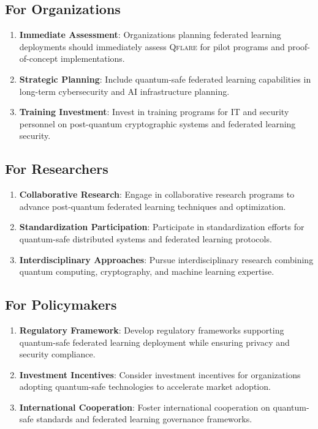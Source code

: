\documentclass[12pt,a4paper,twoside]{book}
\newcommand{\qflare}{\textsc{Qflare}}
\begin{document}
\subsection{For Organizations}

\begin{enumerate}
\item \textbf{Immediate Assessment}: Organizations planning federated learning deployments should immediately assess \qflare{} for pilot programs and proof-of-concept implementations.

\item \textbf{Strategic Planning}: Include quantum-safe federated learning capabilities in long-term cybersecurity and AI infrastructure planning.

\item \textbf{Training Investment}: Invest in training programs for IT and security personnel on post-quantum cryptographic systems and federated learning security.
\end{enumerate}

\subsection{For Researchers}

\begin{enumerate}
\item \textbf{Collaborative Research}: Engage in collaborative research programs to advance post-quantum federated learning techniques and optimization.

\item \textbf{Standardization Participation}: Participate in standardization efforts for quantum-safe distributed systems and federated learning protocols.

\item \textbf{Interdisciplinary Approaches}: Pursue interdisciplinary research combining quantum computing, cryptography, and machine learning expertise.
\end{enumerate}

\subsection{For Policymakers}

\begin{enumerate}
\item \textbf{Regulatory Framework}: Develop regulatory frameworks supporting quantum-safe federated learning deployment while ensuring privacy and security compliance.

\item \textbf{Investment Incentives}: Consider investment incentives for organizations adopting quantum-safe technologies to accelerate market adoption.

\item \textbf{International Cooperation}: Foster international cooperation on quantum-safe standards and federated learning governance frameworks.
\end{enumerate}
\end{document}
